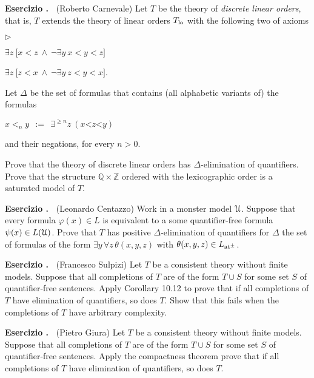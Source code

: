 \documentclass[10pt]{article}
\def\phi{\varphi}
\def\U{\EuScript U}
\def\ZZ{\mathds Z}
\def\QQ{\mathds Q}
\def\E{\exists}
\def\A{\forall}
\newcommand{\labella}[1]{{\sf\footnotesize #1}\hfill}
\renewenvironment{itemize}
  {\begin{list}{$\triangleright$}{%
   \setlength{\parskip}{0mm}
   \setlength{\topsep}{0mm}
   \setlength{\rightmargin}{0mm}
   \setlength{\listparindent}{0mm}
   \setlength{\itemindent}{0mm}
   \setlength{\labelwidth}{3ex}
   \setlength{\itemsep}{0mm}
   \setlength{\parsep}{0mm}
   \setlength{\partopsep}{0mm}
   \setlength{\labelsep}{1ex}
   \setlength{\leftmargin}{\labelwidth+\labelsep}
   \let\makelabel\labella}}{%
   \vspace*{-.3\baselineskip}
  \end{list}}
\newcounter{ex}
\newenvironment{exercise}{\bigskip\addtocounter{ex}{1}\textbf{Esercizio \theex.\ }}{}
\begin{document}
\begin{exercise}
  (Roberto Carnevale)
  Let $T$ be the theory of \emph{discrete linear orders}, that is, $T$ extends the theory of linear orders $T_{\rm lo}$ with the following two of axioms
  \begin{itemize}
  \item[dis$\uparrow$.] $\E z\ \big[x<z\ \wedge\ \neg\E y\ x<y<z\big]$
  \item[dis$\downarrow$.] $\E z\ \big[ z<x\ \wedge\ \neg\E y\ z<y<x\big]$.
  \end{itemize}
  Let $\Delta$ be the set of formulas that contains (all alphabetic variants of) the formulas 

  \hfil $x<_ny\ \ :=\ \ \E^{\ge n}z\ (x\mathord<z\mathord< y)$ 

  and their negations, for every $n>0$.

  Prove that the theory of discrete linear orders has $\Delta$-elimination of quantifiers.
  Prove that the structure $\QQ\times\ZZ$ ordered with the lexicographic order is a saturated model of $T$.
\end{exercise}

\begin{exercise}
  (Leonardo Centazzo)
  Work in a monster model $\U$.
  Suppose that every formula $\phi(x)\in L$ is equivalent to a some quantifier-free formula $\psi(x)\in L(\U)$.
  Prove that $T$ has positive $\Delta$-elimination of quantifiers for $\Delta$ the set of formulas of the form $\E y\,\A z\,\theta(x,y,z)$ with $\theta(x,y,z)\in L_{\rm at^\pm}$.
\end{exercise}

\begin{exercise}
  (Francesco Sulpizi)
  Let $T$ be a consistent theory without finite models.
  Suppose that all completions of $T$ are of the form $T\cup S$ for some set $S$ of quantifier-free sentences.
  Apply Corollary 10.12 to prove that if all completions of $T$ have elimination of quantifiers, so does $T$.
  Show that this fails when the completions of $T$ have arbitrary complexity.
\end{exercise}

\begin{exercise}
  (Pietro Giura)
  Let $T$ be a consistent theory without finite models.
  Suppose that all completions of $T$ are of the form $T\cup S$ for some set $S$ of quantifier-free sentences.
  Apply the compactness theorem prove that if all completions of $T$ have elimination of quantifiers, so does $T$.
\end{exercise}
\end{document}
